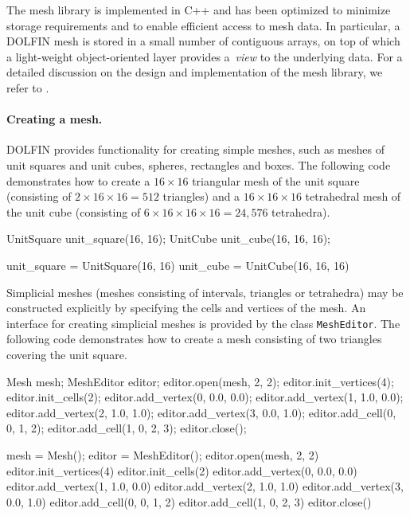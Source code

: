 The mesh library is implemented in C++ and has been optimized to
minimize storage requirements and to enable efficient access to mesh
data. In particular, a DOLFIN mesh is stored in a small number of
contiguous arrays, on top of which a light-weight object-oriented
layer provides a~\emph{view} to the underlying data. For a detailed
discussion on the design and implementation of the mesh library, we
refer to \citet{Logg2009}.

\paragraph{Creating a mesh.}

DOLFIN provides functionality for creating simple meshes, such as
meshes of unit squares and unit cubes, spheres, rectangles and
boxes. The following code demonstrates how to create a $16\times 16$
triangular mesh of the unit square (consisting of $2\times 16\times 16
= 512$ triangles) and a $16\times 16\times 16$ tetrahedral mesh of the
unit cube (consisting of $6\times 16\times 16\times 16 = 24,576$
tetrahedra).

\begin{c++}
UnitSquare unit_square(16, 16);
UnitCube unit_cube(16, 16, 16);
\end{c++}

\begin{python}
unit_square = UnitSquare(16, 16)
unit_cube = UnitCube(16, 16, 16)
\end{python}

Simplicial meshes (meshes consisting of intervals, triangles or
tetrahedra) may be constructed explicitly by specifying the cells and
vertices of the mesh. An interface for creating simplicial meshes is
provided by the class \texttt{MeshEditor}. The following code
demonstrates how to create a mesh consisting of two triangles covering
the unit square.

\begin{c++}
Mesh mesh;
MeshEditor editor;
editor.open(mesh, 2, 2);
editor.init_vertices(4);
editor.init_cells(2);
editor.add_vertex(0, 0.0, 0.0);
editor.add_vertex(1, 1.0, 0.0);
editor.add_vertex(2, 1.0, 1.0);
editor.add_vertex(3, 0.0, 1.0);
editor.add_cell(0, 0, 1, 2);
editor.add_cell(1, 0, 2, 3);
editor.close();
\end{c++}

\begin{python}
mesh = Mesh();
editor = MeshEditor();
editor.open(mesh, 2, 2)
editor.init_vertices(4)
editor.init_cells(2)
editor.add_vertex(0, 0.0, 0.0)
editor.add_vertex(1, 1.0, 0.0)
editor.add_vertex(2, 1.0, 1.0)
editor.add_vertex(3, 0.0, 1.0)
editor.add_cell(0, 0, 1, 2)
editor.add_cell(1, 0, 2, 3)
editor.close()
\end{python}

